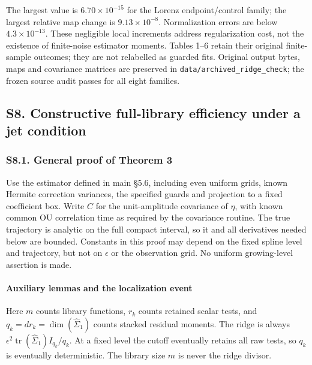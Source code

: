 \documentclass[
  american,
  11pt,
]{article}
\begin{document}
The largest value is \(6.70\times10^{-15}\) for the Lorenz
endpoint/control family; the largest relative map change is
\(9.13\times10^{-8}\). Normalization errors are below
\(4.3\times10^{-13}\). These negligible local increments address
regularization cost, not the existence of finite-noise estimator
moments. Tables 1--6 retain their original finite-sample outcomes; they
are not relabelled as guarded fits. Original output bytes, maps and
covariance matrices are preserved in
\texttt{data/archived\_ridge\_check}; the frozen source audit passes for
all eight families.

\subsection{S8. Constructive full-library efficiency under a jet
condition}\label{s8.-constructive-full-library-efficiency-under-a-jet-condition}

\subsubsection{S8.1. General proof of Theorem
3}\label{s8.1.-general-proof-of-theorem-3}

Use the estimator defined in main §5.6, including even uniform grids,
known Hermite correction variances, the specified guards and projection
to a fixed coefficient box. Write \(C\) for the unit-amplitude
covariance of \(\eta\), with known common OU correlation time as
required by the covariance routine. The true trajectory is analytic on
the full compact interval, so it and all derivatives needed below are
bounded. Constants in this proof may depend on the fixed spline level
and trajectory, but not on \(\epsilon\) or the observation grid. No
uniform growing-level assertion is made.

\paragraph{Auxiliary lemmas and the localization
event}\label{auxiliary-lemmas-and-the-localization-event}

Here \(m\) counts library functions, \(r_k\) counts retained scalar
tests, and \(q_k=d r_k=\dim(\widehat\Sigma_1)\) counts stacked residual
moments. The ridge is always
\(\epsilon^2\operatorname{tr}(\widehat\Sigma_1)I_{q_k}/q_k\). At a fixed
level the cutoff eventually retains all raw tests, so \(q_k\) is
eventually deterministic. The library size \(m\) is never the ridge
divisor.
\end{document}
